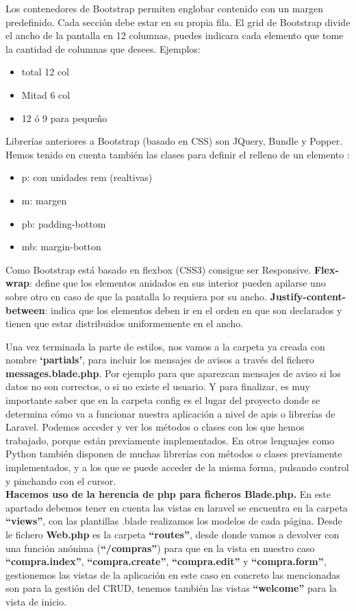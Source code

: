 \documentclass{article}
\begin{document}
Los contenedores de Bootstrap permiten englobar contenido con un margen	 predefinido. Cada sección debe estar en su propia fila. El grid de Bootstrap divide el ancho de la pantalla en 12 columnas, puedes indicara cada elemento que tome la cantidad de columnas que desees. 
Ejemplos: 
\begin{itemize}
    \item total 12 col
    \item Mitad 6 col 
    \item 12 ó 9 para pequeño
\end{itemize} 
	
Librerías anteriores a Bootstrap (basado en CSS) son JQuery, Bundle y Popper.
Hemos tenido en cuenta también las clases para definir el relleno de un elemento :
	\begin{itemize}
	    \item p: con unidades rem (realtivas)
            \item m: margen
	    \item pb: padding-bottom
	    \item mb: margin-botton
	\end{itemize}
        
Como Bootstrap está basado en flexbox (CSS3) consigue ser Responsive.
\textbf{Flex-wrap}: define que los elementos anidados en sus interior pueden apilarse uno sobre otro en caso de que la pantalla lo requiera por su ancho. 
\textbf{Justify-content-between}: indica que los elementos deben ir en el orden en que son declarados y tienen que estar distribuidos uniformemente en el ancho.


Una vez terminada la parte de estilos, nos vamos a la carpeta ya creada con nombre \textbf{‘partials’}, para incluir los mensajes de avisos a través del fichero \textbf{messages.blade.php}. Por ejemplo para que aparezcan mensajes de aviso si los datos no son correctos, o si no existe el usuario.
Y para finalizar, es muy importante saber que en la carpeta config es el lugar del proyecto donde se determina cómo va a funcionar nuestra aplicación a nivel de apis o librerías de Laravel. Podemos acceder y ver los métodos o clases con los que hemos trabajado, porque están previamente implementados. En otros lenguajes como Python también disponen de muchas librerías con métodos o clases previamente implementados, y a los que se puede acceder de la misma forma, pulsando control y pinchando con el cursor.\\

\textbf{Hacemos uso de la herencia de php para ficheros Blade.php.}
En este apartado debemos tener en cuenta las vistas en laravel se encuentra en la carpeta \textbf{``views''}, con las plantillas .blade realizamos los modelos de cada página. Desde le fichero \textbf{Web.php} es la carpeta \textbf{``routes''}, desde donde vamos a devolver con una función anónima (\textbf{``/compras''}) para que en la vista en nuestro caso \textbf{``compra.index''}, \textbf{``compra.create''}, \textbf{``compra.edit''} y \textbf{``compra.form''}, gestionemos las vistas de la aplicación en este caso en concreto las mencionadas son para la gestión del CRUD, tenemos también las vistas \textbf{``welcome''} para la vista de inicio.
\end{document}
